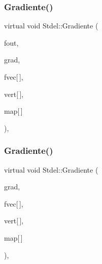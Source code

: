 \subsubsection{\texorpdfstring{Gradiente()}{Gradiente()}\hspace{0.1cm}{\footnotesize\ttfamily [5/6]}}
{\footnotesize\ttfamily virtual void Stdel\+::\+Gradiente (\begin{DoxyParamCaption}\item[{F\+I\+LE $\ast$}]{fout,  }\item[{double $\ast$$\ast$}]{grad,  }\item[{const double}]{fvec\mbox{[}$\,$\mbox{]},  }\item[{const \hyperlink{structVertice}{Vertice}}]{vert\mbox{[}$\,$\mbox{]},  }\item[{const int}]{map\mbox{[}$\,$\mbox{]} }\end{DoxyParamCaption})\hspace{0.3cm}{\ttfamily [pure virtual]}, {\ttfamily [inherited]}}

\mbox{\label{classStdel_aec200dfb0b00bebf70a1d845675eeafd}} 
\subsubsection{\texorpdfstring{Gradiente()}{Gradiente()}\hspace{0.1cm}{\footnotesize\ttfamily [6/6]}}
{\footnotesize\ttfamily virtual void Stdel\+::\+Gradiente (\begin{DoxyParamCaption}\item[{double $\ast$$\ast$}]{grad,  }\item[{const double}]{fvec\mbox{[}$\,$\mbox{]},  }\item[{const \hyperlink{structVertice}{Vertice}}]{vert\mbox{[}$\,$\mbox{]},  }\item[{const int}]{map\mbox{[}$\,$\mbox{]} }\end{DoxyParamCaption})\hspace{0.3cm}{\ttfamily [pure virtual]}, {\ttfamily [inherited]}}

\mbox{\label{classStdel_abb022f0ad81707e11e3a3091d2d87c46}} 
